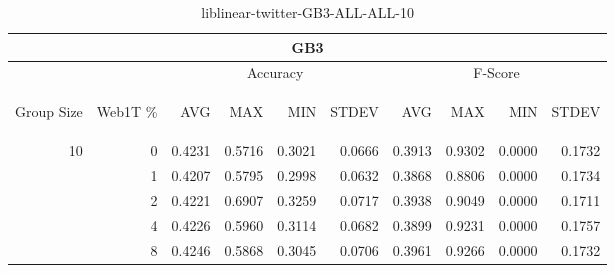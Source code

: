 \begin{center}
\begin{table}[htbp]
\begin{tabular}{ | r | r | r | r | r | r | r | r | r | r |}
\hline
\multicolumn{10}{|c|}{GB3}\\
\hline
 & & \multicolumn{4}{|c|}{Accuracy} & \multicolumn{4}{|c|}{F-Score}\\ \cline{3-10}
\begin{sideways}Group Size\end{sideways} & \begin{sideways}Web1T \%\end{sideways} & \begin{sideways}AVG\end{sideways} & \begin{sideways}MAX\end{sideways} & \begin{sideways}MIN\end{sideways} & \begin{sideways}STDEV\end{sideways} & \begin{sideways}AVG\end{sideways} & \begin{sideways}MAX\end{sideways} & \begin{sideways}MIN\end{sideways} & \begin{sideways}STDEV\end{sideways}\\
\hline
\multirow{4}{*}{10}
 & 0 & 0.4231 & 0.5716 & 0.3021 & 0.0666 & 0.3913 & 0.9302 & 0.0000 & 0.1732\\ \cline{2-10}
 & 1 & 0.4207 & 0.5795 & 0.2998 & 0.0632 & 0.3868 & 0.8806 & 0.0000 & 0.1734\\ \cline{2-10}
 & 2 & 0.4221 & 0.6907 & 0.3259 & 0.0717 & 0.3938 & 0.9049 & 0.0000 & 0.1711\\ \cline{2-10}
 & 4 & 0.4226 & 0.5960 & 0.3114 & 0.0682 & 0.3899 & 0.9231 & 0.0000 & 0.1757\\ \cline{2-10}
 & 8 & 0.4246 & 0.5868 & 0.3045 & 0.0706 & 0.3961 & 0.9266 & 0.0000 & 0.1732\\ \cline{2-10}
\hline
\end{tabular}
\caption{liblinear-twitter-GB3-ALL-ALL-10}
\label{table:liblinear-twitter-GB3-ALL-ALL-10}
\end{table}
\end{center}

